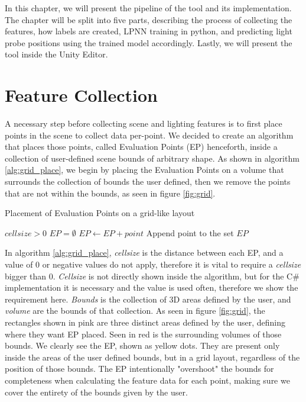 In this chapter, we will present the pipeline of the tool and its implementation. The chapter will be split into five parts, describing the process of collecting the features, how labels are created, LPNN training in python, and predicting light probe positions using the trained model accordingly. Lastly, we will present the tool inside the Unity Editor.

\section{Feature Collection}
A necessary step before collecting scene and lighting features is to first place points in the scene to collect data per-point. We decided to create an algorithm that places those points, called Evaluation Points (EP) henceforth, inside a collection of user-defined scene bounds of arbitrary shape. As shown in algorithm \ref{alg:grid_place}, we begin by placing the Evaluation Points on a volume that surrounds the collection of bounds the user defined, then we remove the points that are not within the bounds, as seen in figure \ref{fig:grid}.


\begin{algorithm}
	\caption{Placement of Evaluation Points on a grid-like layout}
	\label{alg:grid_place}
	\begin{algorithmic}[1]
		\Require $cellsize > 0$
		\State $EP = \emptyset$
				\State $EP \gets EP + point$ \Comment Append point to the set
			\EndIf
		\EndFor
		\State \Return $EP$
	\end{algorithmic}
\end{algorithm}

In algorithm \ref{alg:grid_place}, \textit{cellsize} is the distance between each EP, and a value of 0 or negative values do not apply, therefore it is vital to require a \textit{cellsize} bigger than 0. \textit{Cellsize} is not directly shown inside the algorithm, but for the C\# implementation it is necessary and the value is used often, therefore we show the requirement here. \textit{Bounds} is the collection of 3D areas defined by the user, and \textit{volume} are the bounds of that collection. As seen in figure \ref{fig:grid}, the rectangles shown in pink are three distinct areas defined by the user, defining where they want EP placed. Seen in red is the surrounding volumes of those bounds. We clearly see the EP, shown as yellow dots. They are present only inside the areas of the user defined bounds, but in a grid layout, regardless of the position of those bounds. The EP intentionally "overshoot" the bounds for completeness when calculating the feature data for each point, making sure we cover the entirety of the bounds given by the user.

